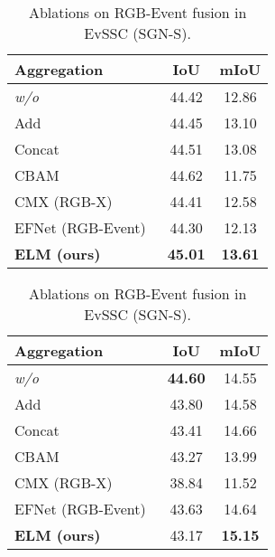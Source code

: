 \begin{table}[t!]
    \vspace{1mm} %

    \begin{subtable}[t]{0.48\linewidth}
        \caption{Ablations on RGB-Event fusion in EvSSC (VoxFormer-S).}
        \centering
        \begin{tabular}{l|c|c}
            \toprule
            \rowcolor{gray!20}
            Aggregation & IoU & mIoU \\
            \midrule
            \midrule
            \textit{w/o} & 44.42 & 12.86 \\ \midrule
            Add & 44.45 & 13.10 \\
            Concat & 44.51 & 13.08 \\
            CBAM~\cite{woo2018cbam} & 44.62 & 11.75 \\
            CMX (RGB-X)~\cite{zhang2023cmx} &44.41 & 12.58\\
            EFNet (RGB-Event)~\cite{sun2022event_deblurring} & 44.30 & 12.13 \\
            \rowcolor{blue!8}\textbf{ELM (ours)} & \textbf{45.01} & \textbf{13.61} \\ 
            \bottomrule
        \end{tabular}
        \label{table:voxformer_fbl}
    \end{subtable}%
    \hfill
    \begin{subtable}[t]{0.48\linewidth}
        \caption{Ablations on RGB-Event fusion in EvSSC (SGN-S).}
        \centering
        \begin{tabular}{l|c|c}
            \toprule
            \rowcolor{gray!20}
            Aggregation & IoU & mIoU \\
            \midrule
            \midrule
            \textit{w/o} & \textbf{44.60} & 14.55 \\ \midrule
            Add & 43.80 & 14.58 \\
            Concat & 43.41 & 14.66 \\ 
            CBAM~\cite{woo2018cbam} & 43.27 & 13.99 \\
            CMX (RGB-X)~\cite{zhang2023cmx} & 38.84 &11.52 \\
            EFNet (RGB-Event)~\cite{sun2022event_deblurring} & 43.63 & 14.64 \\
            \rowcolor{blue!8}\textbf{ELM (ours)} & 43.17 & \textbf{15.15} \\
            \bottomrule
        \end{tabular}
        \label{table:sgn_fbl}
    \end{subtable}%

\label{tab:ablations}

\end{table}


